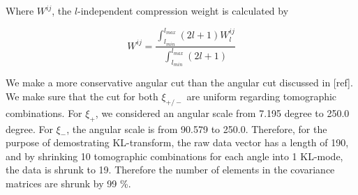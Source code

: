 \documentclass[twocolumn]{\docclass}
\newcommand\be{\begin{equation}}
\newcommand\ee{\end{equation}}
\def\bea{\begin{eqnarray}}
\def\eea{\end{eqnarray}}
\def\svs{\nonumber\\}
\begin{document}
Where $W^{ij}$, the $l$-independent compression weight is calculated by 

\be
W^{ij} = \frac{\int_{l_{min}}^{l_{max}} (2l+1) W^{ij}_l}{\int_{l_{min}}^{l_{max}} (2l+1)}
\ee

We make a more conservative angular cut than the angular cut discussed in [ref]. We make sure that the cut for both $\xi_{+/-}$ are uniform regarding tomographic combinations. For $\xi_+$, we considered an angular scale from 7.195 degree to 250.0 degree. For $\xi_-$, the angular scale is from 90.579 to 250.0. Therefore, for the purpose of demostrating KL-transform, the raw data vector has a length of 190, and by shrinking 10 tomographic combinations for each angle into 1 KL-mode, the data is shrunk to 19. Therefore the number of elements in the covariance matrices are shrunk by 99 \%.







\end{document}
